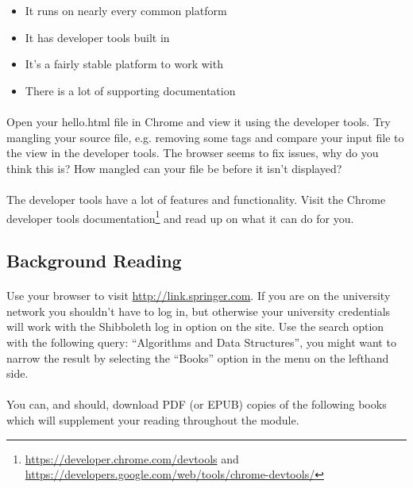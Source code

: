 \documentclass[10pt, a4paper]{article}
\begin{document}
\begin{itemize}
\item It runs on nearly every common platform
\item It has developer tools built in
\item It's a fairly stable platform to work with
\item There is a lot of supporting documentation
\end{itemize}

\paragraph{} Open your hello.html file in Chrome and view it using the developer tools. Try mangling your source file, e.g. removing some tags and compare your input file to the view in the developer tools. The browser seems to fix issues, why do you think this is? How mangled can your file be before it isn't displayed? 

\paragraph{} The developer tools have a lot of features and functionality. Visit the Chrome developer tools documentation\footnote{\url{https://developer.chrome.com/devtools} and \url{https://developers.google.com/web/tools/chrome-devtools/}} and read up on what it can do for you.

\subsection{Background Reading}

\paragraph{} Use your browser to visit \url{http://link.springer.com}. If you are on the university network you shouldn't have to log in, but otherwise your university credentials will work with the Shibboleth log in option on the site. Use the search option with the following query: ``Algorithms and Data Structures'', you might want to narrow the result by selecting the ``Books'' option in the menu on the lefthand side.

\paragraph{} You can, and should, download PDF (or EPUB) copies of the following books which will supplement your reading throughout the module.
\end{document}
